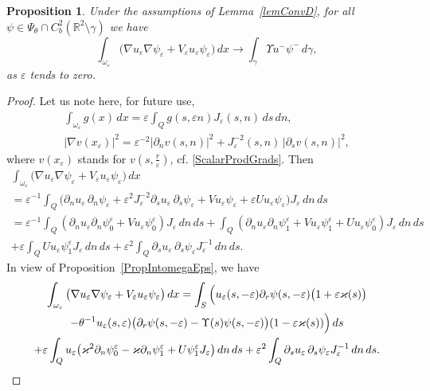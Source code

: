 \documentclass[reqno]{amsart}
\theoremstyle{plain}
\newtheorem{prop}{Proposition}
\numberwithin{equation}{section}
\renewcommand{\kappa}{\varkappa}
\newcommand{\Real}{\mathbb R}
\newcommand{\eps}{\varepsilon}
\newcommand\nep{\textstyle\frac r\eps}
\begin{document}
\begin{prop}
Under the assumptions of Lemma~\ref{lemConvD}, for all $\psi\in \Psi_\theta\cap C_b^2(\Real^2\setminus \gamma)$ we have
  \begin{equation*}
  \int_{\omega_\eps}\big(\nabla u_\eps \nabla \psi_\eps+  V_\eps u_\eps \psi_\eps\big)\,dx\to \int_\gamma \Upsilon u^- \psi^-\,d\gamma,
  \end{equation*}
as $\eps$ tends to zero.
\end{prop}
\begin{proof}
Let us note here, for future use,
\begin{gather*}
 \int_{\omega_\eps} g(x)\,dx=\eps \int_{Q} g(s,\eps n)J_\eps(s,n)\,ds\,dn,
 \\
|\nabla v(x_\eps)|^2=\eps^{-2}|\partial_n v(s,n)|^2+J^{-2}_\eps(s,n )\,|\partial_s v(s,n)|^2,
\end{gather*}
where $v(x_\eps)$ stands for $v(s,\nep)$, cf.  \eqref{ScalarProdGrads}. Then
 \begin{multline*}
     \int_{\omega_\eps}\big(\nabla u_\eps \nabla \psi_\eps+  V_\eps u_\eps \psi_\eps\big)\,dx
     \\
     = \eps^{-1}\int_Q\big( \partial_n u_\eps\, \partial_n \psi_\eps+\eps^2J_\eps^{-2}\partial_s u_\eps \,\partial_s \psi_\eps+ V u_\eps \psi_\eps+\eps U u_\eps \psi_\eps\big)J_\eps \,dn\,ds
     \\
     =\eps^{-1}\int_Q (\partial_n u_\eps \partial_n \psi_0^\eps+Vu_\eps \psi_0^\eps)J_\eps\,dn\,ds
     +\int_Q  (\partial_n u_\eps\partial_n \psi_1^\eps+Vu_\eps \psi_1^\eps+Uu_\eps \psi_0^\eps)J_\eps\,dn\,ds
     \\
     +\eps\int_Q U u_\eps \psi_1^\eps J_\eps\,dn\,ds
     +\eps^2\int_Q \partial_s u_\eps \,\partial_s \psi_\eps J_\eps^{-1} \,dn\,ds.
  \end{multline*}
  In view of Proposition~\ref{PropIntomegaEps}, we have
  \begin{multline}\allowdisplaybreaks
  \label{IntOmegaEpsTo}
     \int_{\omega_\eps}\big(\nabla u_\eps \nabla \psi_\eps+  V_\eps u_\eps \psi_\eps\big)\,dx
     = \int_S \Big(u_\eps(s,-\eps)\partial_r \psi(s,-\eps)\big(1+\eps \kappa(s)\big)
    \\
    -
    \theta^{-1}u_\eps(s,\eps)\big(\partial_r\psi(s,-\eps)-\Upsilon(s)\psi(s,-\eps)\big)(1-\eps \kappa(s))\Big)\,ds
     \\
     +\eps\int_Q u_\eps\big(\kappa^2\partial_n \psi_0^\eps-\kappa\partial_n \psi_1^\eps+U \psi_1^\eps J_\eps\big)\,dn\,ds
     +\eps^2\int_Q \partial_s u_\eps \,\partial_s \psi_\eps J_\eps^{-1} \,dn\,ds.

\end{multline}
\end{proof}
\end{document}
